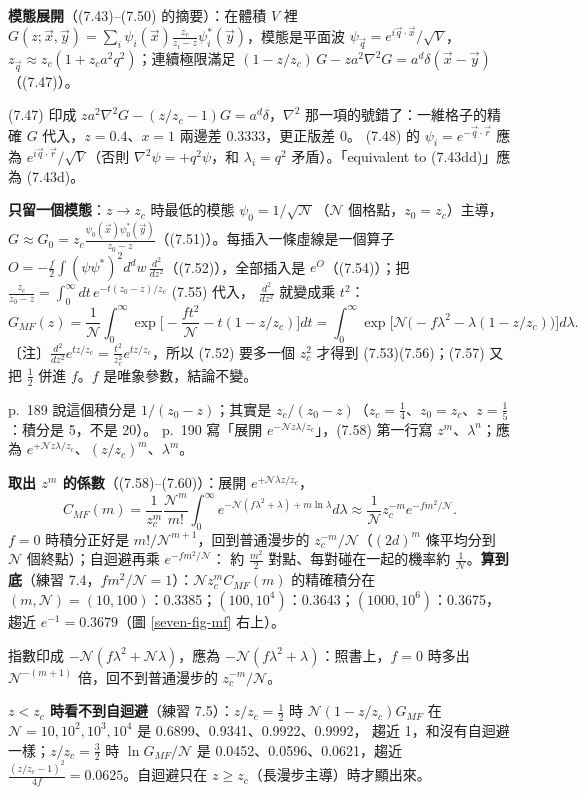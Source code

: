\textbf{模態展開}（(7.43)--(7.50) 的摘要）：在體積 $V$ 裡 $G(z;\vec x,\vec y)=\sum_i\psi_i(\vec x)\frac{z_c}{z_i-z}\psi_i^*(\vec y)$，模態是平面波 $\psi_{\vec q}=e^{i\vec q\cdot\vec x}/\sqrt V$，
$z_{\vec q}\approx z_c(1+z_ca^2q^2)$；連續極限滿足 $(1-z/z_c)\,G-za^2\nabla^2G=a^d\delta(\vec x-\vec y)$（(7.47)）。
\begin{errbox}[p.~188，(7.47)(7.48)、(7.50) 後]
(7.47) 印成 $za^2\nabla^2G-(z/z_c-1)G=a^d\delta$，$\nabla^2$ 那一項的號錯了：一維格子的精確 $G$ 代入，$z=0.4$、$x=1$ 兩邊差 0.3333，更正版差 0。
(7.48) 的 $\psi_i=e^{-\vec q\cdot\vec r}$ 應為 $e^{i\vec q\cdot\vec r}/\sqrt V$（否則 $\nabla^2\psi=+q^2\psi$，和 $\lambda_i=q^2$ 矛盾）。「equivalent to (7.43dd)」應為 (7.43d)。
\end{errbox}
\textbf{只留一個模態}：$z\to z_c$ 時最低的模態 $\psi_0=1/\sqrt{\mathcal N}$（$\mathcal N$ 個格點，$z_0=z_c$）主導，$G\approx G_0=z_c\frac{\psi_0(\vec x)\psi_0^*(\vec y)}{z_0-z}$（(7.51)）。每插入一條虛線是一個算子 $O=-\frac f2\int(\psi\psi^*)^2d^dw\,\frac{d^2}{dz^2}$（(7.52)），全部插入是 $e^{O}$（(7.54)）；把 $\frac{z_c}{z_0-z}=\int_0^\infty dt\,e^{-t(z_0-z)/z_c}$ (7.55) 代入，
$\frac{d^2}{dz^2}$ 就變成乘 $t^2$：
\[G_{MF}(z)=\frac1{\mathcal N}\int_0^\infty\exp\Big[-\frac{ft^2}{\mathcal N}-t(1-z/z_c)\Big]dt=\int_0^\infty\exp\big[\mathcal N\big(-f\lambda^2-\lambda(1-z/z_c)\big)\big]d\lambda .\tag{7.57}\]
〔注〕$\frac{d^2}{dz^2}e^{tz/z_c}=\frac{t^2}{z_c^2}e^{tz/z_c}$，所以 (7.52) 要多一個 $z_c^2$ 才得到 (7.53)(7.56)；(7.57) 又把 $\frac12$ 併進 $f$。$f$ 是唯象參數，結論不變。
\begin{errbox}[p.~189--190，(7.55) 前、(7.58)]
p.~189 說這個積分是 $1/(z_0-z)$；其實是 $z_c/(z_0-z)$（$z_c=\frac14$、$z_0=z_c$、$z=\frac15$：積分是 5，不是 20）。
p.~190 寫「展開 $e^{-\mathcal Nz\lambda/z_c}$」，(7.58) 第一行寫 $z^m$、$\lambda^n$；應為 $e^{+\mathcal Nz\lambda/z_c}$、$(z/z_c)^m$、$\lambda^m$。
\end{errbox}
\textbf{取出 $z^m$ 的係數}（(7.58)--(7.60)）：展開 $e^{+\mathcal N\lambda z/z_c}$，
\[C_{MF}(m)=\frac{1}{z_c^m}\frac{\mathcal N^m}{m!}\int_0^\infty e^{-\mathcal N(f\lambda^2+\lambda)+m\ln\lambda}d\lambda\approx\frac1{\mathcal N}z_c^{-m}e^{-fm^2/\mathcal N}.\tag{7.59, 7.60}\]
$f=0$ 時積分正好是 $m!/\mathcal N^{m+1}$，回到普通漫步的 $z_c^{-m}/\mathcal N$（$(2d)^m$ 條平均分到 $\mathcal N$ 個終點）；自迴避再乘 $e^{-fm^2/\mathcal N}$：
約 $\frac{m^2}2$ 對點、每對碰在一起的機率約 $\frac1{\mathcal N}$。\textbf{算到底}（練習 7.4，$fm^2/\mathcal N=1$）：$\mathcal Nz_c^mC_{MF}(m)$ 的精確積分在
$(m,\mathcal N)=(10,100)$：0.3385；$(100,10^4)$：0.3643；$(1000,10^6)$：0.3675，趨近 $e^{-1}=0.3679$（圖 \ref{seven-fig-mf} 右上）。
\begin{errbox}[p.~190，(7.59)]
指數印成 $-\mathcal N(f\lambda^2+\mathcal N\lambda)$，應為 $-\mathcal N(f\lambda^2+\lambda)$：照書上，$f=0$ 時多出 $\mathcal N^{-(m+1)}$ 倍，回不到普通漫步的 $z_c^{-m}/\mathcal N$。
\end{errbox}
\textbf{$z<z_c$ 時看不到自迴避}（練習 7.5）：$z/z_c=\frac12$ 時 $\mathcal N(1-z/z_c)G_{MF}$ 在 $\mathcal N=10,10^2,10^3,10^4$ 是 0.6899、0.9341、0.9922、0.9992，
趨近 1，和沒有自迴避一樣；$z/z_c=\frac32$ 時 $\ln G_{MF}/\mathcal N$ 是 0.0452、0.0596、0.0621，趨近 $\frac{(z/z_c-1)^2}{4f}=0.0625$。自迴避只在 $z\ge z_c$（長漫步主導）時才顯出來。

